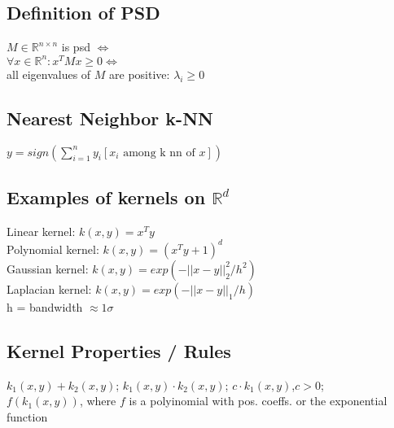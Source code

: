 \subsection*{Definition of PSD}
$M \in \mathbb{R}^{n\times n}$ is psd $\Leftrightarrow$\\
$\forall x \in \mathbb{R}^n: x^TMx \geq 0 \Leftrightarrow$\\
all eigenvalues of $M$ are positive: $\lambda_i\geq 0$

\subsection*{Nearest Neighbor k-NN}
$y=sign(\sum_{i=1}^n y_i [x_i \text{ among k nn of } x])$

\subsection*{Examples of kernels on $\mathbb{R}^d$}
Linear kernel: $k(x,y)=x^T y$\\
Polynomial kernel: $k(x,y)=(x^T y + 1)^d$\\
Gaussian kernel: $k(x,y) = exp(-||x-y||_2^2/h^2)$\\
Laplacian kernel: $k(x,y) = exp(-||x-y||_1/h)$\\
h = bandwidth $\approx 1\sigma$ 


\subsection*{Kernel Properties / Rules}
$k_1(x,y) + k_2(x,y)$; $k_1(x,y) \cdot k_2(x,y)$; $c \cdot k_1(x,y)$,$c>0$;\\
$f(k_1(x,y))$, where $f$ is a polyinomial with pos. coeffs. or the exponential function

\iffalse
\subsection*{Parametric vs. Nonparametric}
\emph{Parametric}: have finite set of parameters\\
E.g. linear regression, linear perceptron,...\\
\emph{Nonparametric}: grow in complexity with the size of the data\\
E.g. kernelized Perceptron, k-NN,...
\fi

